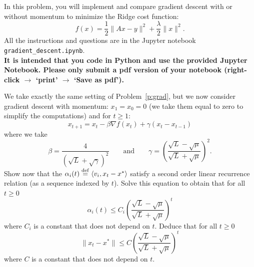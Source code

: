 \documentclass[11pt,nocut]{article}
\begin{document}
\vspace{5mm}

\begin{problem}[3 points]
	In this problem, you will implement and compare gradient descent with or without momentum to minimize the Ridge cost function:
	$$
	f(x) = \frac{1}{2} \|Ax-y\|^2 + \frac{\lambda}{2} \|x\|^2.
	$$
	All the instructions and questions are in the Jupyter notebook \texttt{gradient\_descent.ipynb}.
	\\

	\textbf{It is intended that you code in Python and use the provided Jupyter Notebook. Please only submit a pdf version of your notebook (right-click $\to$ `print' $\to$ `Save as pdf').}
\end{problem}


\vspace{5mm}

\begin{problem}[$\star$]
	We take exactly the same setting of Problem~\ref{p:grad}, but we now consider gradient descent with momentum: $x_1 = x_0 = 0$ (we take them equal to zero to simplify the computations) and for $t \geq 1$:
$$
x_{t+1} = x_t - \beta \nabla f(x_t) + \gamma(x_t -x_{t-1})
$$
where we take
$$
\beta = \frac{4}{(\sqrt{L} + \sqrt{\gamma})^2}
\qquad \text{and} \qquad
\gamma = \left(\frac{\sqrt{L}-\sqrt{\mu}}{\sqrt{L}+\sqrt{\mu}}\right)^{\! 2}.
$$
Show now that the $\alpha_i(t) \overset{\rm def}{=} \langle v_i, x_t - x^* \rangle$ satisfy a second order linear recurrence relation (as a sequence indexed by $t$). Solve this equation to obtain that for all $t \geq 0$
$$
\alpha_i(t) \leq C_i \left(\frac{\sqrt{L}-\sqrt{\mu}}{\sqrt{L} + \sqrt{\mu}}\right)^{\! t}
$$
where $C_i$ is a constant that does not depend on $t$. Deduce that for all $t \geq 0$
$$
\|x_t - x^*\| \leq C \left(\frac{\sqrt{L}-\sqrt{\mu}}{\sqrt{L} + \sqrt{\mu}}\right)^{\! t}
$$
where $C$ is a constant that does not depend on $t$.
\end{problem}




\vspace{1cm}
\centerline{}

%
%
\end{document}
